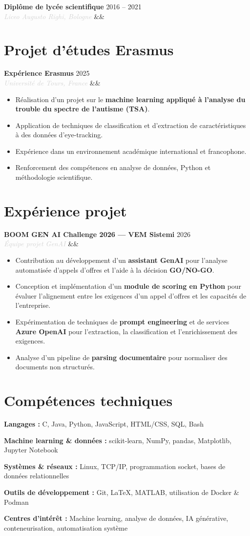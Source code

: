 \documentclass[a4paper,10pt]{article}
\newcommand{\entry}[4]{%
  \noindent\textbf{#1} \hfill \textcolor{accent}{#2}\\
  \textit{\textcolor{lightgray}{#3}}%
  \ifx&#4&\else\\\vspace{0.2em}#4\fi
  \vspace{0.5em}
}
\newcommand{\entrylist}[5]{%
  \noindent\textbf{#1} \hfill \textcolor{accent}{#2}\\
  \textit{\textcolor{lightgray}{#3}}%
  \ifx&#4&\else\\\vspace{0.2em}#4\fi
  \vspace{0.3em}
  \begin{itemize}#5\end{itemize}
  \vspace{0.3em}
}
\newcommand{\skillgroup}[2]{%
  \noindent\textbf{#1 :} #2\par\vspace{0.35em}
}
\begin{document}
\entry{Diplôme de lycée scientifique}{2016 -- 2021}{Liceo Augusto Righi, Bologne}{}

\section{Projet d'études Erasmus}

\entrylist{Expérience Erasmus}{2025}{Université de Tours, France}{}{
  \item Réalisation d'un projet sur le \textbf{machine learning appliqué à l'analyse du trouble du spectre de l'autisme (TSA)}.
  \item Application de techniques de classification et d'extraction de caractéristiques à des données d'eye-tracking.
  \item Expérience dans un environnement académique international et francophone.
  \item Renforcement des compétences en analyse de données, Python et méthodologie scientifique.
}

\section{Expérience projet}

\entrylist{BOOM GEN AI Challenge 2026 — VEM Sistemi}{2026}{Équipe projet GenAI}{}{
  \item Contribution au développement d'un \textbf{assistant GenAI} pour l'analyse automatisée d'appels d'offres et l'aide à la décision \textbf{GO/NO-GO}.
  \item Conception et implémentation d'un \textbf{module de scoring en Python} pour évaluer l'alignement entre les exigences d'un appel d'offres et les capacités de l'entreprise.
  \item Expérimentation de techniques de \textbf{prompt engineering} et de services \textbf{Azure OpenAI} pour l'extraction, la classification et l'enrichissement des exigences.
  \item Analyse d'un pipeline de \textbf{parsing documentaire} pour normaliser des documents non structurés.
}

\section{Compétences techniques}

\skillgroup{Langages}{C, Java, Python, JavaScript, HTML/CSS, SQL, Bash}
\skillgroup{Machine learning \& données}{scikit-learn, NumPy, pandas, Matplotlib, Jupyter Notebook}
\skillgroup{Systèmes \& réseaux}{Linux, TCP/IP, programmation socket, bases de données relationnelles}
\skillgroup{Outils de développement}{Git, \LaTeX, MATLAB, utilisation de Docker \& Podman}
\skillgroup{Centres d'intérêt}{Machine learning, analyse de données, IA générative, conteneurisation, automatisation système}
\end{document}
